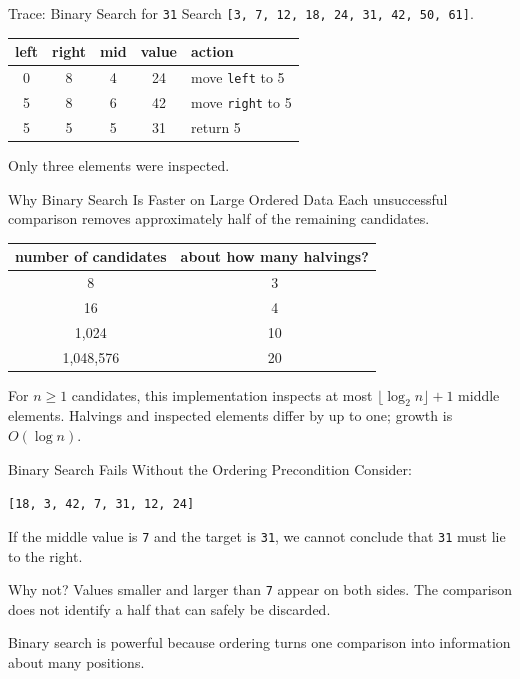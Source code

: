 \documentclass[aspectratio=169,10pt]{beamer}
\begin{document}
\begin{frame}{Trace: Binary Search for \texttt{31}}
  Search \texttt{[3, 7, 12, 18, 24, 31, 42, 50, 61]}.

  \begin{center}
    \renewcommand{\arraystretch}{1.23}
    \begin{tabular}{c|c|c|c|l}
      \textbf{left} & \textbf{right} & \textbf{mid} & \textbf{value} & \textbf{action} \\\hline
      0 & 8 & 4 & 24 & move \texttt{left} to 5 \\
      5 & 8 & 6 & 42 & move \texttt{right} to 5 \\
      5 & 5 & 5 & 31 & return 5
    \end{tabular}
  \end{center}

  Only three elements were inspected.
\end{frame}

\begin{frame}{Why Binary Search Is Faster on Large Ordered Data}
  \small
  Each unsuccessful comparison removes approximately half of the remaining candidates.

  \begin{center}
    \renewcommand{\arraystretch}{1.20}
    \begin{tabular}{c|c}
      \textbf{number of candidates} & \textbf{about how many halvings?} \\\hline
      8 & 3 \\
      16 & 4 \\
      1,024 & 10 \\
      1,048,576 & 20
    \end{tabular}
  \end{center}

  \begin{keyidea}
    For $n\ge1$ candidates, this implementation inspects at most $\lfloor\log_2 n\rfloor+1$ middle elements. Halvings and inspected elements differ by up to one; growth is $O(\log n)$.
  \end{keyidea}
\end{frame}

\begin{frame}{Binary Search Fails Without the Ordering Precondition}
  Consider:
  \begin{center}
    \Large\texttt{[18, 3, 42, 7, 31, 12, 24]}
  \end{center}

  If the middle value is \texttt{7} and the target is \texttt{31}, we cannot conclude that \texttt{31} must lie to the right.

  \begin{alertblock}{Why not?}
    Values smaller and larger than \texttt{7} appear on both sides. The comparison does not identify a half that can safely be discarded.
  \end{alertblock}

  \begin{keyidea}
    Binary search is powerful because ordering turns one comparison into information about many positions.
  \end{keyidea}
\end{frame}
\end{document}
